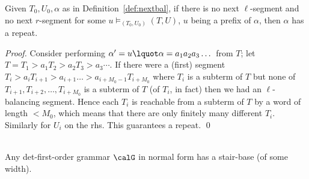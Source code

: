 \documentclass[12pt]{article}
\begin{document}
\begin{prop}
Given  $T_0,U_0,\alpha$ as in Definition~\ref{def:nextbal},
if there is no next $\ell$-segment and no next $r$-segment for some
$u\models_{(T_0,U_0)} (T,U)$, $u$ being a prefix of $\alpha$,
then $\alpha$ has a repeat.
\end{prop}

\begin{proof}
Consider performing $\alpha'=u\lquot \alpha=a_1a_2a_3\dots$ from $T$;
let $T=T_1\gt{a_1}T_2\gt{a_2}T_3\gt{a_3}\cdots$.
If there were a (first) segment $T_i\gt{a_{i}}T_{i+1}\gt{a_{i+1}}\dots
\gt{a_{i+M_0-1}}T_{i+M_0}$ where $T_i$ is a subterm of $T$ but none of 
$T_{i+1}, T_{i+2}, \dots, T_{i+M_0}$ is a subterm of $T$ (of $T_i$, in
fact) then we had an $\ell$-balancing segment. Hence each $T_i$ is
reachable from a subterm of $T$ by a word of length $<M_0$, which
means that there are only finitely many different $T_i$. Similarly for
$U_i$ on the rhs. This guarantees a repeat.
\qed
\end{proof}



\begin{prop}~\label{prop:ghasstairbase}\hfill
\\
Any det-first-order grammar $\calG$ in normal form
has
a stair-base (of some width).
\end{prop}
\end{document}
